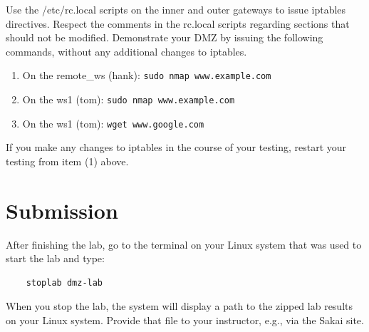 Use the /etc/rc.local scripts on the inner and outer gateways to issue iptables directives.
Respect the comments in the rc.local scripts regarding sections that should not be modified.
Demonstrate your DMZ by issuing the following commands, without any additional changes to iptables.
\begin{enumerate}
\item On the remote\_ws (hank): {\tt sudo nmap www.example.com}
\item On the ws1 (tom): {\tt sudo nmap www.example.com}
\item On the ws1 (tom): {\tt wget www.google.com}
\end{enumerate}
\noindent If you make any changes to iptables in the course of your testing, restart your testing from
item (1) above.

\section{Submission}
After finishing the lab, go to the terminal on your Linux system that was used to start the lab and type:
\begin{verbatim}
    stoplab dmz-lab
\end{verbatim}
When you stop the lab, the system will display a path to the zipped lab results on your Linux system.  Provide that file to 
your instructor, e.g., via the Sakai site.


